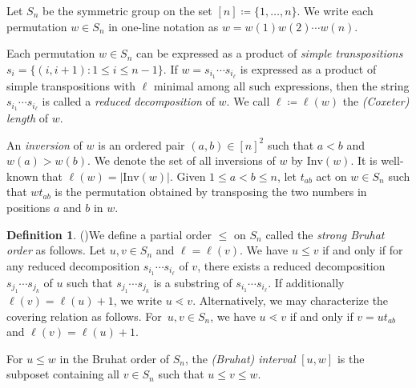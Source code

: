 \documentclass[11pt]{article}
\theoremstyle{definition}
\newtheorem{defi}[theo]{Definition}
\numberwithin{equation}{section}
\newcommand{\Inv}{\mathrm{Inv}}
\begin{document}
Let $S_n$ be the symmetric group on the set $[n] \coloneqq \{1, \dots, n\}$. 
We write each permutation $w\in S_n$ in one-line notation as $w = w(1)w(2)\cdots w(n)$. 

Each permutation $w \in S_n$ can be expressed as a product of \emph{simple transpositions} $s_i = \{(i, i+1) : 1\le i\le n-1\}$. If $w = s_{i_1}\cdots s_{i_{\ell}}$ is expressed as a product of simple transpositions with $\ell$ minimal among all such expressions, then the string $s_{i_1}\cdots s_{i_{\ell}}$ is called a \emph{reduced decomposition} of $w$. We call $\ell \coloneqq \ell(w)$ the \emph{(Coxeter) length} of $w$.

An \emph{inversion} of $w$ is an ordered pair $(a,b)\in [n]^2$ such that $a< b$ and $w(a)>w(b)$. We denote the set of all inversions of $w$ by $\Inv(w)$. It is well-known that $\ell(w) = |\Inv(w)|$. Given $1\le a < b\le n$, let $t_{ab}$ act on $w\in S_n$ such that $wt_{ab}$ is the permutation obtained by transposing the two numbers in positions $a$ and $b$ in $w$.

\begin{defi}(\cite{BjornerBrenti})\label{def:bruhatorder}
    We define a partial order $\le$ on $S_n$ called the \emph{strong Bruhat order} as follows. Let $u, v\in S_n$ and $\ell = \ell(v)$. 
    We have $u\le v$ if and only if for any reduced decomposition $s_{i_1}\cdots s_{i_{\ell}}$ of $v$, there exists a reduced decomposition $s_{j_1}\cdots s_{j_k}$ of $u$ such that $s_{j_1}\cdots s_{j_k}$ is a substring of $s_{i_1}\cdots s_{i_{\ell}}$. If additionally $\ell(v) = \ell(u) + 1$, we write $u\lessdot v$. Alternatively, we may characterize the covering relation as follows. For~$u, v \in S_n$, we have $u \lessdot v$ if and only if $v = ut_{ab}$ and $\ell(v) = \ell(u) + 1$.
\end{defi}

For $u\le w$ in the Bruhat order of $S_n$, the \emph{(Bruhat) interval} $[u, w]$ is the subposet containing all $v\in S_n$ such that $u\le v\le w$. 
\end{document}
